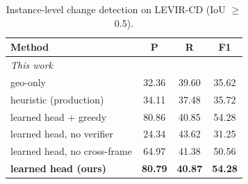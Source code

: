 \begin{table}[t]
\centering
\caption{Instance-level change detection on LEVIR-CD (IoU $\geq$ 0.5).}
\label{tab:levir_cd_instance}
\setlength{\tabcolsep}{4pt}
\begin{tabular}{lccc}
\toprule
Method & P & R & F1 \\
\midrule
\multicolumn{4}{l}{\emph{This work}} \\
geo-only & 32.36 & 39.60 & 35.62 \\
heuristic (production) & 34.11 & 37.48 & 35.72 \\
learned head + greedy & 80.86 & 40.85 & 54.28 \\
learned head, no verifier & 24.34 & 43.62 & 31.25 \\
learned head, no cross-frame & 64.97 & 41.38 & 50.56 \\
\textbf{learned head (ours)} & \textbf{80.79} & \textbf{40.87} & \textbf{54.28} \\
\bottomrule
\end{tabular}
\end{table}
